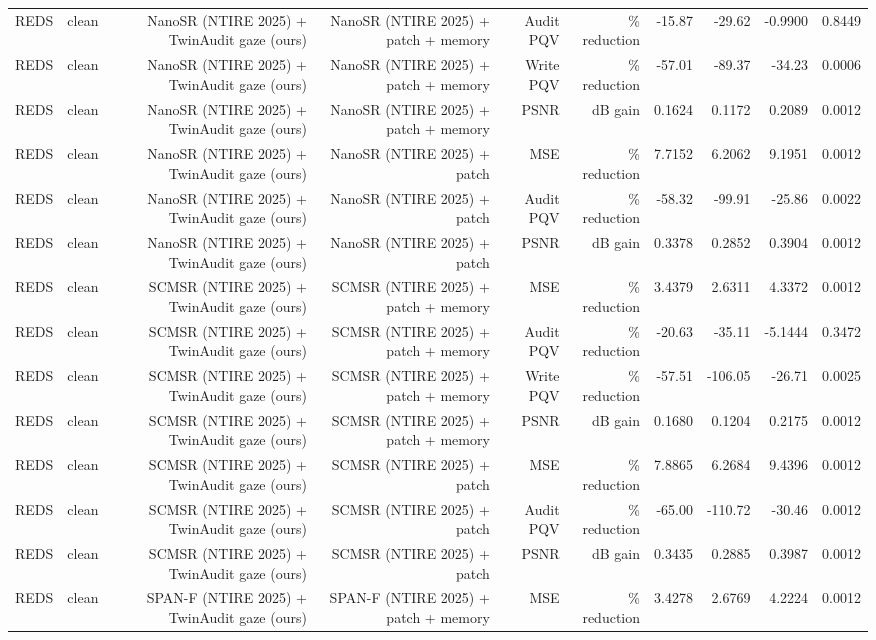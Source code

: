 \begin{table}[t]
\begin{tabular}{llrrrrrrrr}
REDS & clean & NanoSR (NTIRE 2025) + TwinAudit gaze (ours) & NanoSR (NTIRE 2025) + patch + memory & Audit PQV & \% reduction & -15.87 & -29.62 & -0.9900 & 0.8449 \\
REDS & clean & NanoSR (NTIRE 2025) + TwinAudit gaze (ours) & NanoSR (NTIRE 2025) + patch + memory & Write PQV & \% reduction & -57.01 & -89.37 & -34.23 & 0.0006 \\
REDS & clean & NanoSR (NTIRE 2025) + TwinAudit gaze (ours) & NanoSR (NTIRE 2025) + patch + memory & PSNR & dB gain & 0.1624 & 0.1172 & 0.2089 & 0.0012 \\
REDS & clean & NanoSR (NTIRE 2025) + TwinAudit gaze (ours) & NanoSR (NTIRE 2025) + patch & MSE & \% reduction & 7.7152 & 6.2062 & 9.1951 & 0.0012 \\
REDS & clean & NanoSR (NTIRE 2025) + TwinAudit gaze (ours) & NanoSR (NTIRE 2025) + patch & Audit PQV & \% reduction & -58.32 & -99.91 & -25.86 & 0.0022 \\
REDS & clean & NanoSR (NTIRE 2025) + TwinAudit gaze (ours) & NanoSR (NTIRE 2025) + patch & PSNR & dB gain & 0.3378 & 0.2852 & 0.3904 & 0.0012 \\
REDS & clean & SCMSR (NTIRE 2025) + TwinAudit gaze (ours) & SCMSR (NTIRE 2025) + patch + memory & MSE & \% reduction & 3.4379 & 2.6311 & 4.3372 & 0.0012 \\
REDS & clean & SCMSR (NTIRE 2025) + TwinAudit gaze (ours) & SCMSR (NTIRE 2025) + patch + memory & Audit PQV & \% reduction & -20.63 & -35.11 & -5.1444 & 0.3472 \\
REDS & clean & SCMSR (NTIRE 2025) + TwinAudit gaze (ours) & SCMSR (NTIRE 2025) + patch + memory & Write PQV & \% reduction & -57.51 & -106.05 & -26.71 & 0.0025 \\
REDS & clean & SCMSR (NTIRE 2025) + TwinAudit gaze (ours) & SCMSR (NTIRE 2025) + patch + memory & PSNR & dB gain & 0.1680 & 0.1204 & 0.2175 & 0.0012 \\
REDS & clean & SCMSR (NTIRE 2025) + TwinAudit gaze (ours) & SCMSR (NTIRE 2025) + patch & MSE & \% reduction & 7.8865 & 6.2684 & 9.4396 & 0.0012 \\
REDS & clean & SCMSR (NTIRE 2025) + TwinAudit gaze (ours) & SCMSR (NTIRE 2025) + patch & Audit PQV & \% reduction & -65.00 & -110.72 & -30.46 & 0.0012 \\
REDS & clean & SCMSR (NTIRE 2025) + TwinAudit gaze (ours) & SCMSR (NTIRE 2025) + patch & PSNR & dB gain & 0.3435 & 0.2885 & 0.3987 & 0.0012 \\
REDS & clean & SPAN-F (NTIRE 2025) + TwinAudit gaze (ours) & SPAN-F (NTIRE 2025) + patch + memory & MSE & \% reduction & 3.4278 & 2.6769 & 4.2224 & 0.0012 \\

\end{tabular}
\end{table}
